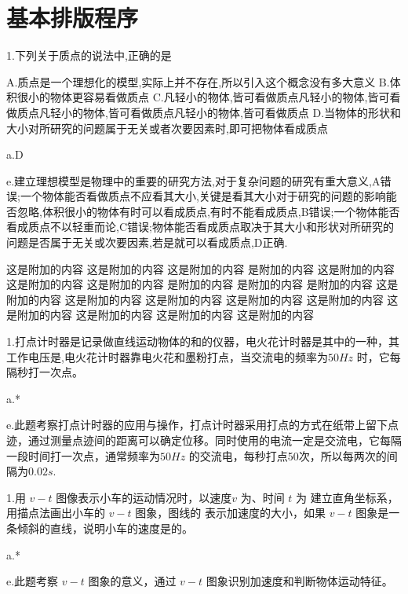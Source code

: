\chapter{基本排版程序}
\begin{choices}
   1.下列关于质点的说法中,正确的是
   A.质点是一个理想化的模型,实际上并不存在,所以引入这个概念没有多大意义
   B.体积很小的物体更容易看做质点
   C.凡轻小的物体,皆可看做质点凡轻小的物体,皆可看做质点凡轻小的物体,皆可看做质点凡轻小的物体,皆可看做质点
   D.当物体的形状和大小对所研究的问题属于无关或者次要因素时,即可把物体看成质点

   a.D

   e.建立理想模型是物理中的重要的研究方法,对于复杂问题的研究有重大意义,A错误;一个物体能否看做质点不应看其大小,关键是看其大小对于研究的问题的影响能否忽略,体积很小的物体有时可以看成质点,有时不能看成质点,B错误;一个物体能否看成质点不以轻重而论,C错误;物体能否看成质点取决于其大小和形状对所研究的问题是否属于无关或次要因素,若是就可以看成质点,D正确.
\end{choices}
这是附加的内容
这是附加的内容
这是附加的内容
是附加的内容
这是附加的内容
这是附加的内容
这是附加的内容
是附加的内容
是附加的内容
是附加的内容
这是附加的内容
这是附加的内容
这是附加的内容
这是附加的内容
这是附加的内容
这是附加的内容
这是附加的内容
这是附加的内容
这是附加的内容

 \begin{blanks}[exp]
  1.打点计时器是记录做直线运动物体的和的仪器，电火花计时器是其中的一种，其工作电压是,电火花计时器靠电火花和墨粉打点，当交流电的频率为$50Hz$ 时，它每隔秒打一次点。
 
 a.*
 
 e.此题考察打点计时器的应用与操作，打点计时器采用打点的方式在纸带上留下点迹，通过测量点迹间的距离可以确定位移。同时使用的电流一定是交流电，它每隔一段时间打一次点，通常频率为$50Hz$ 的交流电，每秒打点50次，所以每两次的间隔为$0.02s$.
 
 \end{blanks}

 \begin{blanks}
  1.用 $v-t$ 图像表示小车的运动情况时，以速度$v$ 为、时间 $t$ 为 建立直角坐标系，用描点法画出小车的 $v-t$ 图象，图线的  表示加速度的大小，如果 $v-t$ 图象是一条倾斜的直线，说明小车的速度是的。
 
 a.*
 
 e.此题考察 $v-t$ 图象的意义，通过 $v-t$ 图象识别加速度和判断物体运动特征。
 \end{blanks}

